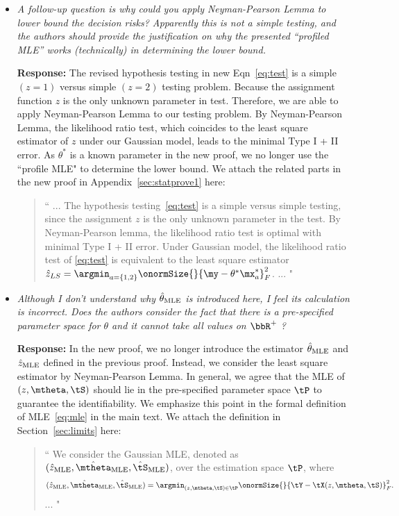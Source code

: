 \documentclass[11pt]{article}
\theoremstyle{definition}
\theoremstyle{definition}
\begin{document}
\begin{enumerate}
\begin{enumerate}[wide]
\begin{itemize}
        \item \textit{A follow-up question is why could you apply Neyman-Pearson Lemma to lower bound the decision risks? Apparently this is not a simple testing, and the authors should provide the justification on why the presented “profiled MLE” works (technically) in determining the lower bound.}
        
        \textbf{Response:} The revised hypothesis testing in new Eqn~\eqref{eq:test} is a simple $(z = 1)$ versus simple $(z = 2)$ testing problem. Because the assignment function $z$ is the only unknown parameter in test. Therefore, we are able to apply Neyman-Pearson Lemma to our testing problem. By Neyman-Pearson Lemma, the likelihood ratio test, which coincides to the least square estimator of $z$ under our Gaussian model, leads to the minimal Type I + II error. As $\theta^*$ is a known parameter in the new proof, we no longer use the ``profile MLE" to determine the lower bound. We attach the related parts in the new proof in Appendix~\ref{sec:statprove1} here:
        
        \begin{quote}
            ``
            ... The hypothesis testing~\eqref{eq:test} is a simple versus simple testing, since the assignment $z$ is the only unknown parameter in the test. By Neyman-Pearson lemma, the likelihood ratio test is optimal with minimal Type I + II error. Under Gaussian model, the likelihood ratio test of \eqref{eq:test} is equivalent to the least square estimator $\hat z_{LS} = \argmin_{a = \{1,2\}} \onormSize{}{\my - \theta^* \mx_a^*}_F^2$.  ...
            "
        \end{quote}
        
        \item \textit{Although I don’t understand why $\hat \theta_{\rm MLE}$ is introduced here, I feel its calculation is incorrect. Does the authors consider the fact that there is a pre-specified parameter space for $\theta$ and it cannot take all values on $\bbR^+$ ?}
        
        \textbf{Response:} In the new proof, we no longer introduce the estimator $\hat \theta_{\rm MLE}$ and $\hat z_{\rm MLE}$ defined in the previous proof. Instead, we consider the least square estimator by Neyman-Pearson Lemma. In general, we agree that the MLE of $(z, \mtheta, \tS)$ should lie in the pre-specified parameter space $\tP$ to guarantee the identifiability. We emphasize this point in the formal definition of MLE~\eqref{eq:mle} in the main text. We attach the definition in Section~\ref{sec:limits} here:
        \begin{quote}
            ``
            We consider the Gaussian MLE, denoted as $(\hat z_{\text{MLE}}, \hat \mtheta_{\text{MLE}}, \hat \tS_{\text{MLE}})$, over the estimation space $\tP$, where 
\begin{equation}
    (\hat z_{\text{MLE}}, \hat \mtheta_{\text{MLE}}, \hat \tS_{\text{MLE}}) = \argmin_{ (z, \mtheta, \tS) \in \tP} \onormSize{}{\tY - \tX(z,\mtheta, \tS)}_F^2.
\end{equation}
...
            "
        \end{quote}
        

\end{itemize}
\end{enumerate}
\end{enumerate}
\end{document}
